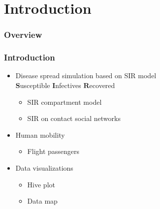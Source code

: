 \documentclass{beamer}
\begin{document}
\section{Introduction} %
\begin{frame}
\frametitle{Overview} %
\tableofcontents[currentsection] %
\end{frame}
\begin{frame}
\frametitle{Introduction}
\begin{itemize}
\item Disease spread simulation based on SIR model 	\\ $\textbf{S}$usceptible $\textbf{I}$nfectives $\textbf{R}$ecovered
	\begin{itemize}
	\item SIR compartment model
	\item SIR on contact social networks 
	\end{itemize}
\item Human mobility
	\begin{itemize}
	\item Flight passengers
	\end{itemize}
\item Data visualizations
	\begin{itemize}
	\item Hive plot
	\item Data map
	\end{itemize}
\end{itemize}
\vspace{20pt}
\end{frame}
\end{document}
